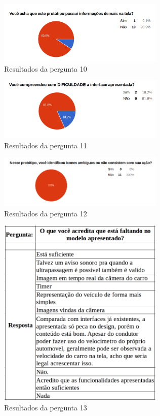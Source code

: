 \begin{itemize}
\begin{figure}[h]
  \centering
  \includegraphics[width=300px, scale=1]{figuras/result10}
  \caption{Resultados da pergunta 10}
\label{fig:result10}
\end{figure}


\begin{figure}[h]
  \centering
  \includegraphics[width=300px, scale=1]{figuras/result11}
  \caption{Resultados da pergunta 11}
\label{fig:result11}
\end{figure}


\begin{figure}[h]
  \centering
  \includegraphics[width=300px, scale=1]{figuras/result12}
  \caption{Resultados da pergunta 12}
\label{fig:result12}
\end{figure}
	 	 	 	
\begin{figure}[h]
  \centering
  \includegraphics[width=300px, scale=1]{figuras/quadro1}
  \caption{Resultados da pergunta 13}
\label{fig:quadro1}
\end{figure}			


\end{itemize}
